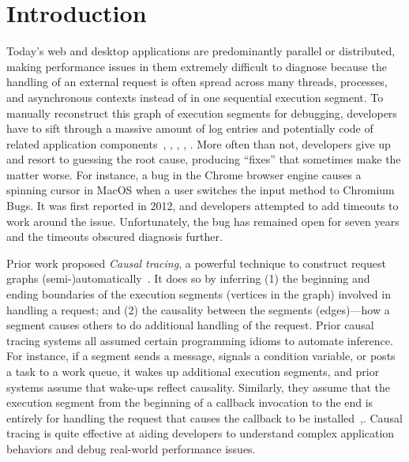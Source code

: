 \section{Introduction} \label{sec:intro}
%

%

Today's web and desktop applications are predominantly parallel or
distributed, making performance issues in them extremely difficult to
diagnose because the handling of an external request is often spread
across many threads, processes, and asynchronous
contexts
instead of in one
sequential execution segment\cite{harter2012file}.  To manually reconstruct this graph of execution
segments for debugging, developers have to sift through a massive amount of log
entries and potentially code of related application
components~\cite{chen2002pinpoint}, \cite{zhao2016non}, \cite{xu2009detecting},
\cite{nagaraj2012structured}, \cite{yuan2012conservative}.  More often
than not, developers give up and resort to guessing the root cause, producing
``fixes'' that sometimes make the matter worse.  For instance, a bug in the
Chrome browser engine causes a spinning cursor in MacOS when a user switches
the input method to Chromium Bugs\cite{chromiumbugreport}.  It was first reported in 2012, and
developers attempted to add timeouts to work around the issue.  Unfortunately,
the bug has remained open for seven years and the timeouts obscured diagnosis
further.

Prior work proposed \emph{Causal tracing}, a powerful technique to construct
request graphs (semi-)automatically~\cite{zhang2013panappticon}. It does so by
inferring (1) the beginning and ending boundaries of the execution segments
(vertices in the graph) involved in handling a request; and (2) the causality
between the segments (edges)---how a segment causes others to do additional
handling of the request.  Prior causal tracing systems all assumed certain
programming idioms to automate inference.  For instance, if a segment sends a
message, signals a condition variable, or posts a task to a work queue, it
wakes up additional execution segments, and prior systems assume that wake-ups
reflect causality.  Similarly, they assume that the execution segment from the
beginning of a callback invocation to the end is entirely for handling the
request that causes the callback to be
installed~\cite{zhang2013panappticon},\cite{ravindranath2012appinsight}.  Causal
tracing is quite effective at aiding developers to understand complex
application behaviors and debug real-world performance issues.%

